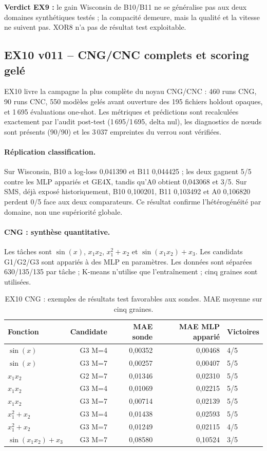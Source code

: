 \documentclass[11pt,a4paper]{article}
\begin{document}
\textbf{Verdict EX9 :} le gain Wisconsin de B10/B11 ne se généralise pas aux deux domaines synthétiques testés ; la compacité demeure, mais la qualité et la vitesse ne suivent pas. XOR8 n'a pas de résultat test exploitable.

\subsection{EX10 v011 -- CNG/CNC complets et scoring gelé}

EX10 livre la campagne la plus complète du noyau CNG/CNC : 460 runs CNG, 90 runs CNC, 550 modèles gelés avant ouverture des 195 fichiers holdout opaques, et 1\,695 évaluations one-shot. Les métriques et prédictions sont recalculées exactement par l'audit post-test (1\,695/1\,695, delta nul), les diagnostics de nœuds sont présents (90/90) et les 3\,037 empreintes du verrou sont vérifiées.

\paragraph{Réplication classification.} Sur Wisconsin, B10 a log-loss 0,041390 et B11 0,044425 ; les deux gagnent 5/5 contre les MLP appariés et GE4X, tandis qu'A0 obtient 0,043068 et 3/5. Sur SMS, déjà exposé historiquement, B10 0,100201, B11 0,103492 et A0 0,106820 perdent 0/5 face aux deux comparateurs. Ce résultat confirme l'hétérogénéité par domaine, non une supériorité globale.

\paragraph{CNG : synthèse quantitative.} Les tâches sont \(\sin(x)\), \(x_1x_2\), \(x_1^2+x_2\) et \(\sin(x_1x_2)+x_3\). Les candidats G1/G2/G3 sont appariés à des MLP en paramètres. Les données sont séparées 630/135/135 par tâche ; K-means n'utilise que l'entraînement ; cinq graines sont utilisées.

\begin{table}[H]
\centering\small
\caption{EX10 CNG : exemples de résultats test favorables aux sondes. MAE moyenne sur cinq graines.}
\begin{tabularx}{\textwidth}{lrrrl}
\toprule
Fonction & Candidate & MAE sonde & MAE MLP apparié & Victoires\\
\midrule
\(\sin(x)\) & G3 M=4 & 0,00352 & 0,00468 & 4/5\\
\(\sin(x)\) & G3 M=7 & 0,00257 & 0,00407 & 5/5\\
\(x_1x_2\) & G2 M=7 & 0,01346 & 0,02310 & 5/5\\
\(x_1x_2\) & G3 M=4 & 0,01069 & 0,02215 & 5/5\\
\(x_1x_2\) & G3 M=7 & 0,00714 & 0,02139 & 5/5\\
\(x_1^2+x_2\) & G3 M=4 & 0,01438 & 0,02593 & 5/5\\
\(x_1^2+x_2\) & G3 M=7 & 0,01249 & 0,02115 & 4/5\\
\(\sin(x_1x_2)+x_3\) & G3 M=7 & 0,08580 & 0,10524 & 3/5\\
\bottomrule
\end{tabularx}
\end{table}
\end{document}
